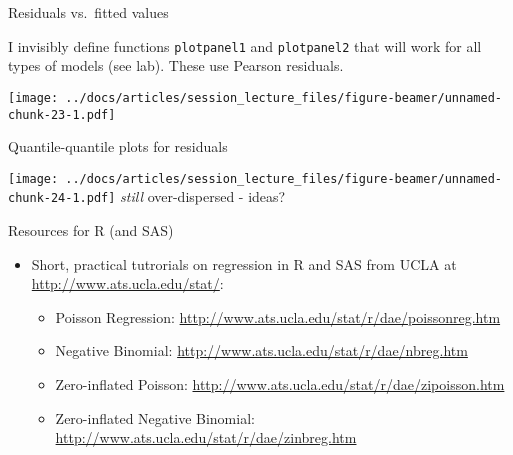\documentclass[
  ignorenonframetext,
]{beamer}
\providecommand{\tightlist}{%
  \setlength{\itemsep}{0pt}\setlength{\parskip}{0pt}}
\begin{document}
\begin{frame}[fragile]{Residuals vs.~fitted values}
\protect\hypertarget{residuals-vs.-fitted-values}{}

I invisibly define functions \texttt{plotpanel1} and \texttt{plotpanel2}
that will work for all types of models (see lab). These use Pearson
residuals.

\texttt{[image: ../docs/articles/session\_lecture\_files/figure-beamer/unnamed-chunk-23-1.pdf]}

\end{frame}

\begin{frame}{Quantile-quantile plots for residuals}
\protect\hypertarget{quantile-quantile-plots-for-residuals}{}

\texttt{[image: ../docs/articles/session\_lecture\_files/figure-beamer/unnamed-chunk-24-1.pdf]}
\emph{still} over-dispersed - ideas?

\end{frame}

\begin{frame}{Resources for R (and SAS)}
\protect\hypertarget{resources-for-r-and-sas}{}

\begin{itemize}
\tightlist
\item
  Short, practical tutrorials on regression in R and SAS from UCLA at
  \url{http://www.ats.ucla.edu/stat/}:

  \begin{itemize}
  \tightlist
  \item
    Poisson Regression:
    \url{http://www.ats.ucla.edu/stat/r/dae/poissonreg.htm}
  \item
    Negative Binomial:
    \url{http://www.ats.ucla.edu/stat/r/dae/nbreg.htm}
  \item
    Zero-inflated Poisson:
    \url{http://www.ats.ucla.edu/stat/r/dae/zipoisson.htm}
  \item
    Zero-inflated Negative Binomial:
    \url{http://www.ats.ucla.edu/stat/r/dae/zinbreg.htm}
  \end{itemize}
\end{itemize}

\end{frame}
\end{document}
